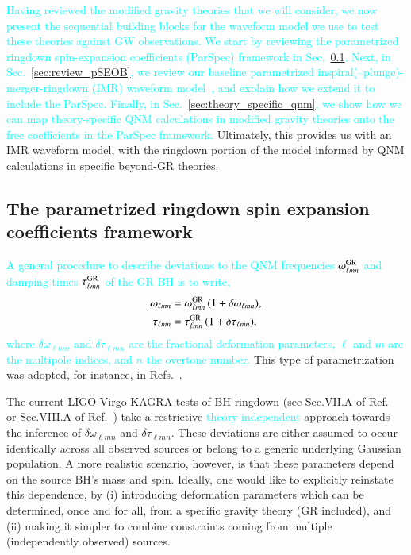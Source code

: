 \documentclass[twocolumn,
               prd,
               aps,
               superscriptaddress,
               tightenlines,
               nofootinbib,
               eqsecnum,
               amsfonts,
               amsmath,
               longbibliography]{revtex4-1}
\newcommand{\ab}[1]{{\textcolor{cyan}{{#1}} }}
\begin{document}
\ab{Having reviewed the modified gravity theories that we will consider, we now present
the sequential building blocks for the waveform model we use to test these theories
against GW observations.
%
We start by reviewing the parametrized ringdown spin-expansion coefficients (ParSpec) framework in Sec.~\ref{sec:review_parspec}.
%
Next, in Sec.~\ref{sec:review_pSEOB}, we review our baseline
parametrized inspiral(--plunge)-merger-ringdown (IMR) waveform
model~\cite{Brito:2018rfr,Ghosh:2021mrv}, and explain how we extend
it to include the ParSpec.
%
Finally, in Sec.~\ref{sec:theory_specific_qnm}, we show how we can map
theory-specific QNM calculations in modified gravity theories onto the
free coefficients in the ParSpec framework.}
%
Ultimately, this provides us with an IMR waveform model, with the ringdown
portion of the model informed by QNM calculations in specific beyond-GR
theories.

\subsection{The parametrized ringdown spin expansion coefficients framework}
\label{sec:review_parspec}

\ab{A general procedure to describe deviations to the QNM frequencies $\omega^{\rm GR}_{\ell m n}$ and
damping times $\tau^{\rm GR}_{\ell m n}$ of the GR BH is to write,}
%
\begin{subequations}
\label{eq:general_deviation}
\begin{align}
\omega_{\ell m n} &= \omega_{\ell m n}^{\rm GR} \, (1 + \delta \omega_{\ell m n}), \\
\tau_{\ell m n }   &= \tau_{\ell m  n}^{\rm GR}   \, (1 + \delta \tau_{\ell m n }),
\end{align}
\end{subequations}
%
\ab{where $\delta\omega_{\ell m n}$ and $\delta\tau_{\ell m  n}$ are the fractional deformation parameters,
$\ell$ and $m$ are the multipole indices, and $n$ the overtone number.}
%
This type of parametrization was adopted, for instance, in Refs.~\cite{Gossan:2011ha,Meidam:2014jpa,Brito:2018rfr,Carullo:2018sfu,Ghosh:2021mrv}.

The current LIGO-Virgo-KAGRA tests of BH ringdown (see Sec.VII.A
of Ref.~\cite{LIGOScientific:2020tif} or Sec.VIII.A
of Ref.~\cite{LIGOScientific:2021sio}) take a restrictive \ab{theory-independent} 
approach towards the inference of $\delta\omega_{\ell m n}$ and
$\delta\tau_{\ell m n}$. These deviations are either assumed to occur
identically across all observed sources or belong to a generic
underlying Gaussian population. A more realistic scenario, however, is
that these parameters depend on the source BH's mass and spin.
%
Ideally, one would like to explicitly reinstate this dependence, by
%
(i) introducing deformation parameters which can be determined, once and for
all, from a specific gravity theory (GR included), and
%
(ii) making it simpler to combine constraints coming from multiple (independently observed) sources.
\end{document}
